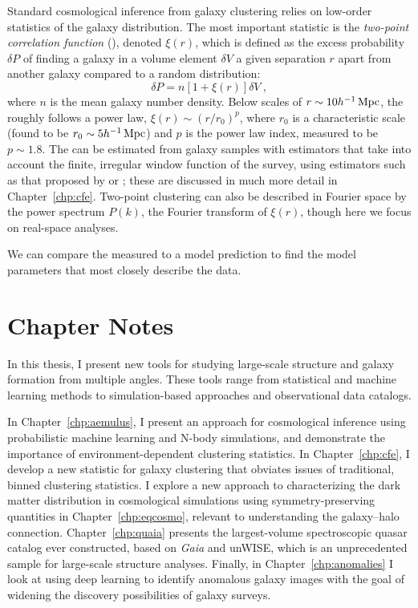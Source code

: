 Standard cosmological inference from galaxy clustering relies on low-order statistics of the galaxy distribution. 
The most important statistic is the \emph{two-point correlation function} (\cf), denoted $\xi(r)$, which is defined as the excess probability $\delta P$ of finding a galaxy in a volume element $\delta V$ a given separation $r$ apart from another galaxy compared to a random distribution:
\begin{equation}
    \delta P = n[1+\xi(r)]\delta V ~,
\end{equation}
where $n$ is the mean galaxy number density.
Below scales of $r \sim 10 h^{-1}\,\mathrm{Mpc}$, the \cf roughly follows a power law, $\xi(r) \sim (r/r_0)^p$, where $r_0$ is a characteristic scale (found to be $r_0 \sim 5 h^{-1}\,\mathrm{Mpc}$) and $p$ is the power law index, measured to be $p \sim 1.8$.
The \cf can be estimated from galaxy samples with estimators that take into account the finite, irregular window function of the survey, using estimators such as that proposed by \citep{DavisPeebles1983} or \citep{LandySzalay1993}; these are discussed in much more detail in Chapter~\ref{chp:cfe}.
Two-point clustering can also be described in Fourier space by the power spectrum $P(k)$, the Fourier transform of $\xi(r)$, though here we focus on real-space analyses.

We can compare the measured \cf to a model prediction to find the model parameters that most closely describe the data.




\section{Chapter Notes}

In this thesis, I present new tools for studying large-scale structure and galaxy formation from multiple angles.
These tools range from statistical and machine learning methods to simulation-based approaches and observational data catalogs.

In Chapter~\ref{chp:aemulus}, I present an approach for cosmological inference using probabilistic machine learning and N-body simulations, and demonstrate the importance of environment-dependent clustering statistics.
In Chapter~\ref{chp:cfe}, I develop a new statistic for galaxy clustering that obviates issues of traditional, binned clustering statistics.
I explore a new approach to characterizing the dark matter distribution in cosmological simulations using symmetry-preserving quantities in Chapter~\ref{chp:eqcosmo}, relevant to understanding the galaxy--halo connection.
Chapter~\ref{chp:quaia} presents the largest-volume spectroscopic quasar catalog ever constructed, based on \emph{Gaia} and unWISE, which is an unprecedented sample for large-scale structure analyses.
Finally, in Chapter~\ref{chp:anomalies} I look at using deep learning to identify anomalous galaxy images with the goal of widening the discovery possibilities of galaxy surveys.

